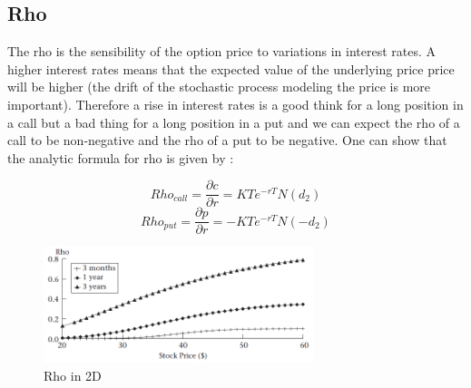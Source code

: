 \documentclass[hidelinks]{article}
\begin{document}
\clearpage
    \subsection{Rho}
    
    The rho is the sensibility of the option price to variations in interest rates. A higher interest rates means that the expected value of the underlying price price will be higher (the drift of the stochastic process modeling the price is more important). Therefore a rise in interest rates is a good think for a long position in a call but a bad thing for a long position in a put and we can expect the rho of a call to be non-negative and the rho of a put to be negative.  One can show that the analytic formula for rho is given by :
    
    $$Rho_{call} = \frac{\partial c}{\partial r} = KTe^{-rT}N(d_2)$$
    $$Rho_{put} = \frac{\partial p}{\partial r} = -KTe^{-rT}N(-d_2)$$
    
    \begin{figure}[!h]
	\centering
	
	\includegraphics[width=0.7\textwidth]{rho_2d.png}
	
	\caption{Rho in 2D}
	\label{fig:rho2d}
	\end{figure}
    
\end{document}
